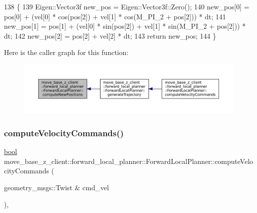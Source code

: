 \begin{DoxyCode}
138 \{
139     Eigen::Vector3f new\_pos = Eigen::Vector3f::Zero();
140     new\_pos[0] = pos[0] + (vel[0] * cos(pos[2]) + vel[1] * cos(M\_PI\_2 + pos[2])) * dt;
141     new\_pos[1] = pos[1] + (vel[0] * sin(pos[2]) + vel[1] * sin(M\_PI\_2 + pos[2])) * dt;
142     new\_pos[2] = pos[2] + vel[2] * dt;
143     \textcolor{keywordflow}{return} new\_pos;
144 \}
\end{DoxyCode}
Here is the caller graph for this function\+:
\nopagebreak
\begin{figure}[H]
\begin{center}
\leavevmode
\includegraphics[width=350pt]{classmove__base__z__client_1_1forward__local__planner_1_1ForwardLocalPlanner_a1065c0e507dbea9cef4f0c2c6118eafb_icgraph}
\end{center}
\end{figure}
\mbox{\label{classmove__base__z__client_1_1forward__local__planner_1_1ForwardLocalPlanner_a6eb89b6d08da6d4e84750705120e699a}} 
\subsubsection{\texorpdfstring{compute\+Velocity\+Commands()}{computeVelocityCommands()}}
{\footnotesize\ttfamily \hyperlink{classbool}{bool} move\+\_\+base\+\_\+z\+\_\+client\+::forward\+\_\+local\+\_\+planner\+::\+Forward\+Local\+Planner\+::compute\+Velocity\+Commands (\begin{DoxyParamCaption}\item[{geometry\+\_\+msgs\+::\+Twist \&}]{cmd\+\_\+vel }\end{DoxyParamCaption})\hspace{0.3cm}{\ttfamily [override]}, {\ttfamily [virtual]}}



